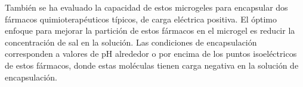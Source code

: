 Tambi\'en se ha evaluado la capacidad de estos microgeles para encapsular dos f\'armacos quimioterap\'euticos t\'ipicos, de carga el\'ectrica positiva.
El \'optimo enfoque para mejorar la partici\'on de estos f\'armacos en el microgel es reducir la concentraci\'on de sal en la soluci\'on.
Las condiciones de encapsulaci\'on corresponden a valores de pH alrededor o por encima de los puntos isoel\'ectricos de estos f\'armacos, donde estas mol\'eculas tienen carga negativa en la soluci\'on de encapsulaci\'on. 